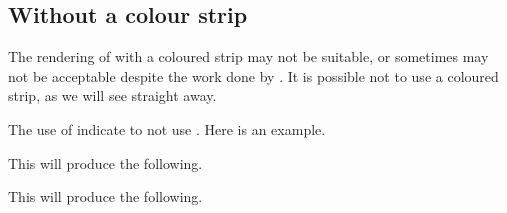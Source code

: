 \documentclass[10pt, a4paper]{article}
\begin{document}

\subsection{Without a colour strip}

The rendering of  with a coloured strip may not be suitable, or sometimes may not be acceptable despite the work done by .
It is possible not to use a coloured strip, as we will see straight away.

\begin{tdocexa}
    The use of  indicate to not use .
    Here is an example.


    This will produce the following.

    \medskip

    
\end{tdocexa}




\begin{tdocexa}
    \leavevmode


    This will produce the following.

    \medskip

    
\end{tdocexa}
\end{document}
